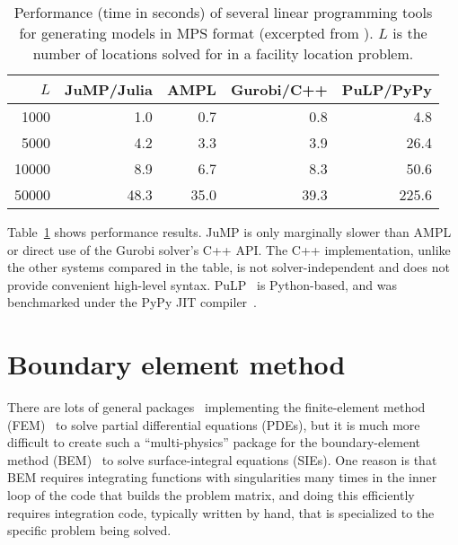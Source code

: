 \begin{table}[!t]
\begin{center}
\begin{tabular}{|r|r|r|r|r|}\hline
\textbf{$L$} & \textbf{JuMP/Julia} & \textbf{AMPL} & \textbf{Gurobi/C++} & \textbf{PuLP/PyPy} \\
\hline \hline
1000    & 1.0 & 0.7 & 0.8 & 4.8 \\
\hline
5000    & 4.2 & 3.3 & 3.9 & 26.4 \\
\hline
10000   & 8.9 & 6.7 & 8.3 & 50.6 \\
\hline
50000   & 48.3 & 35.0 & 39.3 & 225.6 \\
\hline
\end{tabular}
\end{center}
\caption[Performance of linear programming tools]{
\small{
Performance (time in seconds) of several linear programming tools for
generating models in MPS format (excerpted from \cite{LubinDunningIJOC}).
$L$ is the number of locations solved for in a facility location problem.
}
}
\label{jumpperf}
\end{table}

Table~\ref{jumpperf} shows performance results.
JuMP is only marginally slower than AMPL or direct use of the Gurobi solver's
C++ API.
The C++ implementation, unlike the other systems compared in the table,
is not solver-independent and does not provide convenient high-level syntax.
PuLP~\cite{mitchell2011pulp} is Python-based, and was benchmarked under the
PyPy JIT compiler~\cite{pypyjit}.


\section{Boundary element method}
\label{sec:BEM}

There are lots of general
packages~\cite{LoggOlgaardEtAl2012a,Rathgeber2015} implementing the
finite-element method (FEM)~\cite{Zienkiewicz13} to solve partial
differential equations (PDEs), but it is much more difficult to create
such a ``multi-physics'' package for the boundary-element method
(BEM)~\cite{Bonnet99,Chew09} to solve surface-integral equations
(SIEs).  One reason is that BEM requires integrating functions with singularities
many times in the inner loop of the code that builds the problem matrix, and
doing this efficiently requires integration code, typically written by hand, that is specialized to
the specific problem being solved.

